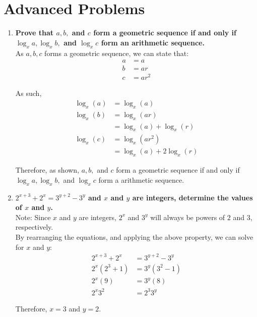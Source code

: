 \documentclass[12pt]{article}
\begin{document}
\section*{Advanced Problems}
\begin{enumerate}
    \item \textbf{Prove that $a, b,$ and $c$ form a geometric sequence if and only if $\log_x{a}, \log_x{b},$ and $\log_x{c}$ form an arithmetic sequence.} \\
    
    As $a, b, c$ forms a geometric sequence, we can state that:
    \begin{align*}
        a &= a \\
        b &= ar \\
        c &= ar^2
    \end{align*}
    
    
    As such,
    \begin{align*}
        \log_x(a) &= \log_x(a) \\
        \log_x(b) &= \log_x(ar) \\
                  &= \log_x(a) + \log_x(r) \\
        \log_x(c) &= \log_x(ar^2) \\
                  &= \log_x(a) + 2\log_x(r)
    \end{align*}
    
    Therefore, as shown, $a, b,$ and $c$ form a geometric sequence if and only if $\log_x{a}, \log_x{b},$ and $\log_x{c}$ form a arithmetic sequence.
    
    \item \textbf{$\displaystyle{ 2^{x + 3} + 2^x = 3^{y + 2} - 3^y}$ and $x$ and $y$ are integers, determine the values of $x$ and $y$.} \\
    
    Note: Since $x$ and $y$ are integers, $2^x$ and $3^y$ will always be powers of $2$ and $3$, respectively. \\
    
    By rearranging the equations, and applying the above property, we can solve for $x$ and $y$:
    \begin{align*}
        2^{x + 3} + 2^x &= 3^{y + 2} - 3^y \\
        2^x(2^3 + 1) &= 3^y(3^2 - 1) \\
        2^x (9) &= 3^y (8) \\
        2^x 3^2 &= 2^3 3^y 
    \end{align*}
    
    Therefore, $x = 3$ and $y = 2$.
    
\end{enumerate}
\end{document}
